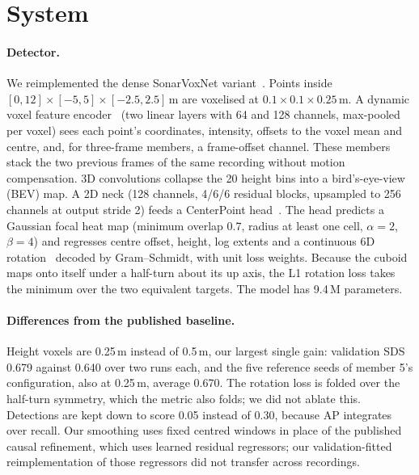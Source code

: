 \documentclass[10pt,twocolumn,letterpaper]{article}
\newcommand{\sds}{\mbox{SDS}}
\begin{document}
\section{System}
\label{sec:system}
\paragraph{Detector.}
We reimplemented the dense SonarVoxNet variant~\cite{sonarvoxnet2026}.
Points inside $[0,12]\times[-5,5]\times[-2.5,2.5]$\,m are voxelised at $0.1\times0.1\times0.25$\,m.
A dynamic voxel feature encoder~\cite{voxelnet2018} (two linear layers with 64 and 128 channels, max-pooled per voxel) sees each point's coordinates, intensity, offsets to the voxel mean and centre, and, for three-frame members, a frame-offset channel.
These members stack the two previous frames of the same recording without motion compensation.
3D convolutions collapse the 20 height bins into a bird's-eye-view (BEV) map.
A 2D neck (128 channels, 4/6/6 residual blocks, upsampled to 256 channels at output stride 2) feeds a CenterPoint head~\cite{centerpoint2021}.
The head predicts a Gaussian focal heat map (minimum overlap 0.7, radius at least one cell, $\alpha=2$, $\beta=4$) and regresses centre offset, height, log extents and a continuous 6D rotation~\cite{zhou2019continuity} decoded by Gram--Schmidt, with unit loss weights.
Because the cuboid maps onto itself under a half-turn about its up axis, the L1 rotation loss takes the minimum over the two equivalent targets.
The model has 9.4\,M parameters.

\paragraph{Differences from the published baseline.}
Height voxels are 0.25\,m instead of 0.5\,m, our largest single gain: validation \sds{} 0.679 against 0.640 over two runs each, and the five reference seeds of member 5's configuration, also at 0.25\,m, average 0.670.
The rotation loss is folded over the half-turn symmetry, which the metric also folds; we did not ablate this.
Detections are kept down to score 0.05 instead of 0.30, because AP integrates over recall.
Our smoothing uses fixed centred windows in place of the published causal refinement, which uses learned residual regressors; our validation-fitted reimplementation of those regressors did not transfer across recordings.
\end{document}
